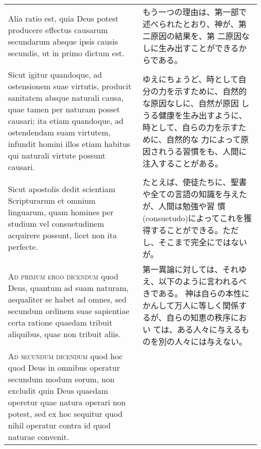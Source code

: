 \documentclass[10pt]{jsarticle} %
\begin{document}
\begin{longtable}{p{21em}p{21em}}
Alia ratio est, quia Deus potest
producere effectus causarum secundarum absque ipsis causis secundis,
ut in primo dictum est. 


&

もう一つの理由は、第一部で述べられたとおり、神が、第二原因の結果を、第
 二原因なしに生み出すことができるからである。

\\

Sicut igitur quandoque, ad ostensionem suae
virtutis, producit sanitatem absque naturali causa, quae tamen per
naturam posset causari; ita etiam quandoque, ad ostendendam suam
virtutem, infundit homini illos etiam habitus qui naturali virtute
possunt causari. 


&

ゆえにちょうど、時として自分の力を示すために、自然的な原因なしに、自然が原因
 しうる健康を生み出すように、時として、自らの力を示すために、自然的な
 力によって原因されうる習慣をも、人間に注入することがある。

\\

Sicut apostolis dedit scientiam Scripturarum et
omnium linguarum, quam homines per studium vel consuetudinem acquirere
possunt, licet non ita perfecte.

&

たとえば、使徒たちに、聖書や全ての言語の知識を与えたが、人間は勉強や習
慣(consuetudo)によってこれを獲得することができる。ただし、そこまで完全にではないが。

\\



{\scshape Ad primum ergo dicendum} quod Deus, quantum ad suam naturam, aequaliter
se habet ad omnes, sed secundum ordinem suae sapientiae certa ratione
quaedam tribuit aliquibus, quae non tribuit aliis.

&

第一異論に対しては、それゆえ、以下のように言われるべきである。
神は自らの本性にかんして万人に等しく関係するが、自らの知恵の秩序におい
 ては、ある人々に与えるものを別の人々には与えない。

\\




{\scshape Ad secundum dicendum} quod hoc quod Deus in omnibus operatur secundum
modum eorum, non excludit quin Deus quaedam operetur quae natura
operari non potest, sed ex hoc sequitur quod nihil operatur contra id
quod naturae convenit.



\end{longtable}
\end{document}
